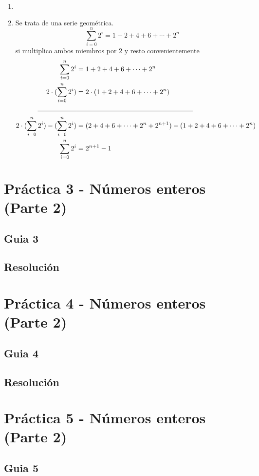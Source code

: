 \documentclass[12pt]{book}
\begin{document}
\begin{enumerate}
\item %
\item %
Se trata de una serie geom\'etrica.
\[ \sum_{i=0}^{n} 2^i = 1+2+4+6+\cdots+2^n\] si multiplico ambos miembros por 2 y resto convenientemente
\begin{align*}
 \sum_{i=0}^{n} 2^i &= 1+2+4+6+\cdots+2^n  \\
  2 \cdot (\sum_{i=0}^{n} 2^i) &= 2\cdot(1+2+4+6+\cdots+2^n) \\
  \rule{20mm}{0.2mm} &  \rule{60mm}{0.2mm} \\
 2 \cdot (\sum_{i=0}^{n} 2^i)-  (\sum_{i=0}^{n} 2^i)  &= (2+4+6+ \cdots +2^n+2^{n+1}) - (1+2+4+6+ \cdots +2^n) \\
 \sum_{i=0}^{n} 2^i &= 2^{n+1} -1
\end{align*}
\end{enumerate}


\chapter{Práctica 3 - Números enteros (Parte 2)}
\section{Guia 3}



\section{Resoluci\'on}



\chapter{Práctica 4 - Números enteros (Parte 2)}
\section{Guia 4}



\section{Resoluci\'on}


\chapter{Práctica 5 - Números enteros (Parte 2)}
\section{Guia 5}

\end{document}
